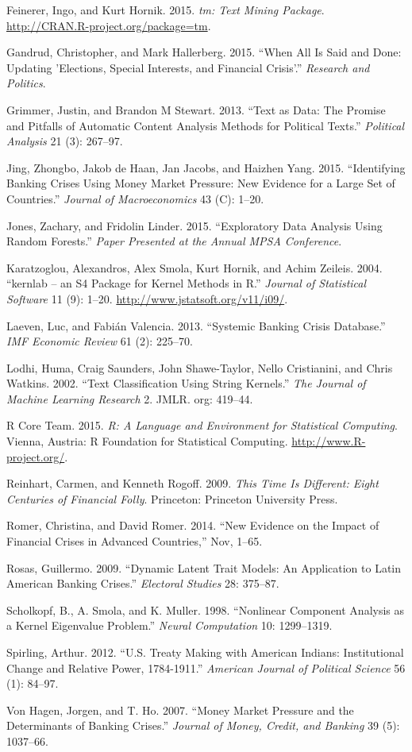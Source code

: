 \documentclass[]{article}
\begin{document}
Feinerer, Ingo, and Kurt Hornik. 2015. \emph{tm: Text Mining Package}.
\url{http://CRAN.R-project.org/package=tm}.

Gandrud, Christopher, and Mark Hallerberg. 2015. ``When All Is Said and
Done: Updating 'Elections, Special Interests, and Financial Crisis'.''
\emph{Research and Politics}.

Grimmer, Justin, and Brandon M Stewart. 2013. ``Text as Data: The
Promise and Pitfalls of Automatic Content Analysis Methods for Political
Texts.'' \emph{Political Analysis} 21 (3): 267--97.

Jing, Zhongbo, Jakob de Haan, Jan Jacobs, and Haizhen Yang. 2015.
``Identifying Banking Crises Using Money Market Pressure: New Evidence
for a Large Set of Countries.'' \emph{Journal of Macroeconomics} 43 (C):
1--20.

Jones, Zachary, and Fridolin Linder. 2015. ``Exploratory Data Analysis
Using Random Forests.'' \emph{Paper Presented at the Annual MPSA
Conference}.

Karatzoglou, Alexandros, Alex Smola, Kurt Hornik, and Achim Zeileis.
2004. ``kernlab -- an S4 Package for Kernel Methods in R.''
\emph{Journal of Statistical Software} 11 (9): 1--20.
\url{http://www.jstatsoft.org/v11/i09/}.

Laeven, Luc, and Fabi{á}n Valencia. 2013. ``Systemic Banking Crisis
Database.'' \emph{IMF Economic Review} 61 (2): 225--70.

Lodhi, Huma, Craig Saunders, John Shawe-Taylor, Nello Cristianini, and
Chris Watkins. 2002. ``Text Classification Using String Kernels.''
\emph{The Journal of Machine Learning Research} 2. JMLR. org: 419--44.

R Core Team. 2015. \emph{R: A Language and Environment for Statistical
Computing}. Vienna, Austria: R Foundation for Statistical Computing.
\url{http://www.R-project.org/}.

Reinhart, Carmen, and Kenneth Rogoff. 2009. \emph{This Time Is
Different: Eight Centuries of Financial Folly}. Princeton: Princeton
University Press.

Romer, Christina, and David Romer. 2014. ``New Evidence on the Impact of
Financial Crises in Advanced Countries,'' Nov, 1--65.

Rosas, Guillermo. 2009. ``Dynamic Latent Trait Models: An Application to
Latin American Banking Crises.'' \emph{Electoral Studies} 28: 375--87.

Scholkopf, B., A. Smola, and K. Muller. 1998. ``Nonlinear Component
Analysis as a Kernel Eigenvalue Problem.'' \emph{Neural Computation} 10:
1299--1319.

Spirling, Arthur. 2012. ``U.S. Treaty Making with American Indians:
Institutional Change and Relative Power, 1784-1911.'' \emph{American
Journal of Political Science} 56 (1): 84--97.

{Von Hagen}, Jorgen, and T. Ho. 2007. ``Money Market Pressure and the
Determinants of Banking Crises.'' \emph{Journal of Money, Credit, and
Banking} 39 (5): 1037--66.
\end{document}
